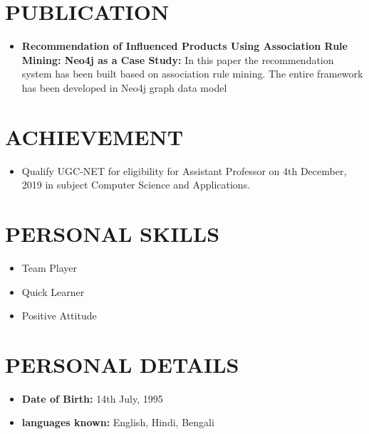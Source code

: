 \documentclass[letterpaper,11pt]{article}
\newcommand{\resumeSubHeadingListStart}{\begin{itemize}[leftmargin=0.0in, label={}]}
\newcommand{\resumeSubHeadingListEnd}{\end{itemize}}
\begin{document}
\vspace{-20pt}
\section{PUBLICATION}
\begin{itemize}
\item \textbf{Recommendation of Influenced Products Using Association Rule Mining: Neo4j as a Case Study:} In this paper the recommendation system has been built based on association rule mining. The entire framework has been developed in Neo4j graph data model {\href{https://link.springer.com/article/10.1007/s42979-021-00460-8}{\raisebox{-0.1\height}\faExternalLink }}
\end{itemize}
    
 
 \vspace{-30pt}
\section{ACHIEVEMENT}
\begin{itemize} 
\item Qualify UGC-NET for eligibility for Assistant Professor on 4th December, 2019 in subject Computer Science and Applications.
\end{itemize} 

\vspace{-35pt}
\section{PERSONAL SKILLS}
        \begin{multicols}{4}
            \begin{itemize}[itemsep=-2pt, parsep=1pt]
                \item Team Player
                \item Quick Learner
                \item Positive Attitude
            \end{itemize}
        \end{multicols}
        \vspace*{2.0\multicolsep}

\vspace{-10pt}
\section{PERSONAL DETAILS}
\begin{itemize} 
\item \textbf{Date of Birth:} 14th July, 1995
\vspace{-10pt}
\item \textbf{languages known: } English, Hindi, Bengali
\end{itemize} 
\end{document}
